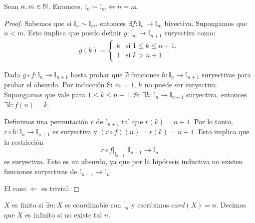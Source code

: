 \begin{theorem}
    Sean \(n, m \in \mathbb{N} \). Entonces, \(\mathbb{I}_n \sim \mathbb{I}_m \iff n = m\).
    \begin{proof}
        Sabemos que si \(\mathbb{I}_n \sim \mathbb{I}_m\), entonces \(\exists f: \mathbb{I}_n \to \mathbb{I}_m\) biyectiva. Supongamos que \(n < m\). Esto implica que puedo definir \(g: \mathbb{I}_m \to \mathbb{I}_{n+1} \) suryectiva como:
        \begin{align*}
            g(k) =
            \begin{cases}
                k & \text{si } 1 \leq k \leq n+1, \\
                1 & \text{si } k > n+1.
            \end{cases}
        \end{align*}

        Dada \(g \circ f: \mathbb{I}_n \to \mathbb{I}_{n+1} \) basta probar que \(\nexists \) funciones \(h: \mathbb{I}_n \to \mathbb{I}_{n+1} \) suryectivas para probar el absurdo. Por inducción
        Si \(m = 1\), \(h\) no puede ser suryectiva. Supongamos que vale para \(1 \leq k \leq n-1\). Si \(\exists h: \mathbb{I}_n \to \mathbb{I}_{n+1} \) suryectiva, entonces \(\exists k : f(n) = k\).

        Definimos una permutación \(r\) de \(\mathbb{I}_{n+1} \) tal que \(r(k) = n+1\). Por lo tanto, \(r \circ h: \mathbb{I}_n \to \mathbb{I}_{n+1} \) es suryectiva y \((r \circ f)(n) = r(k) = n+1\). Esto implica que la restricción
        \[
            r \circ f|_{\mathbb{I}_{n-1}} : \mathbb{I}_{n-1} \to \mathbb{I}_n
        \]
        es suryectiva. Esto es un absurdo, ya que por la hipótesis inductiva no existen funciones suryectivas de \(\mathbb{I}_{n-1} \to \mathbb{I}_n \).

        El caso \(\Leftarrow \) es trivial.
    \end{proof}
\end{theorem}

\begin{definition}
    \(X \) es finito si \(\exists n: X \) es coordinable con \(\mathbb{I}_n\) y escribimos \(card(X)=n\). Decimos que \(X\) es infinito si no existe tal \(n\).
\end{definition}
